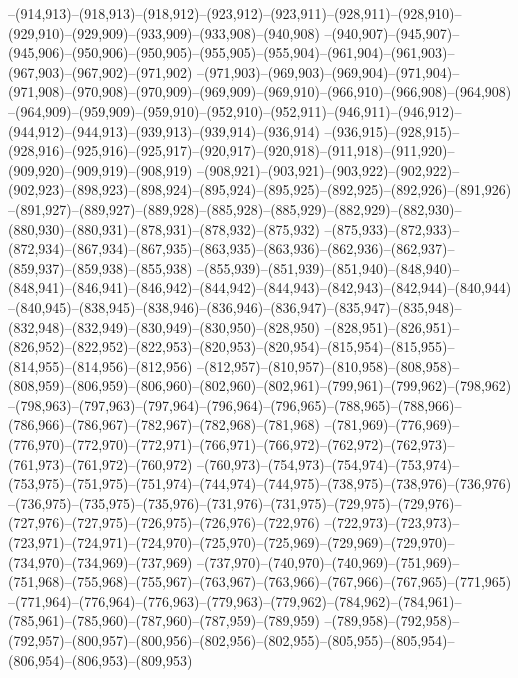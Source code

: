 --(914,913)--(918,913)--(918,912)--(923,912)--(923,911)--(928,911)--(928,910)--(929,910)--(929,909)--(933,909)--(933,908)--(940,908)
--(940,907)--(945,907)--(945,906)--(950,906)--(950,905)--(955,905)--(955,904)--(961,904)--(961,903)--(967,903)--(967,902)--(971,902)
--(971,903)--(969,903)--(969,904)--(971,904)--(971,908)--(970,908)--(970,909)--(969,909)--(969,910)--(966,910)--(966,908)--(964,908)
--(964,909)--(959,909)--(959,910)--(952,910)--(952,911)--(946,911)--(946,912)--(944,912)--(944,913)--(939,913)--(939,914)--(936,914)
--(936,915)--(928,915)--(928,916)--(925,916)--(925,917)--(920,917)--(920,918)--(911,918)--(911,920)--(909,920)--(909,919)--(908,919)
--(908,921)--(903,921)--(903,922)--(902,922)--(902,923)--(898,923)--(898,924)--(895,924)--(895,925)--(892,925)--(892,926)--(891,926)
--(891,927)--(889,927)--(889,928)--(885,928)--(885,929)--(882,929)--(882,930)--(880,930)--(880,931)--(878,931)--(878,932)--(875,932)
--(875,933)--(872,933)--(872,934)--(867,934)--(867,935)--(863,935)--(863,936)--(862,936)--(862,937)--(859,937)--(859,938)--(855,938)
--(855,939)--(851,939)--(851,940)--(848,940)--(848,941)--(846,941)--(846,942)--(844,942)--(844,943)--(842,943)--(842,944)--(840,944)
--(840,945)--(838,945)--(838,946)--(836,946)--(836,947)--(835,947)--(835,948)--(832,948)--(832,949)--(830,949)--(830,950)--(828,950)
--(828,951)--(826,951)--(826,952)--(822,952)--(822,953)--(820,953)--(820,954)--(815,954)--(815,955)--(814,955)--(814,956)--(812,956)
--(812,957)--(810,957)--(810,958)--(808,958)--(808,959)--(806,959)--(806,960)--(802,960)--(802,961)--(799,961)--(799,962)--(798,962)
--(798,963)--(797,963)--(797,964)--(796,964)--(796,965)--(788,965)--(788,966)--(786,966)--(786,967)--(782,967)--(782,968)--(781,968)
--(781,969)--(776,969)--(776,970)--(772,970)--(772,971)--(766,971)--(766,972)--(762,972)--(762,973)--(761,973)--(761,972)--(760,972)
--(760,973)--(754,973)--(754,974)--(753,974)--(753,975)--(751,975)--(751,974)--(744,974)--(744,975)--(738,975)--(738,976)--(736,976)
--(736,975)--(735,975)--(735,976)--(731,976)--(731,975)--(729,975)--(729,976)--(727,976)--(727,975)--(726,975)--(726,976)--(722,976)
--(722,973)--(723,973)--(723,971)--(724,971)--(724,970)--(725,970)--(725,969)--(729,969)--(729,970)--(734,970)--(734,969)--(737,969)
--(737,970)--(740,970)--(740,969)--(751,969)--(751,968)--(755,968)--(755,967)--(763,967)--(763,966)--(767,966)--(767,965)--(771,965)
--(771,964)--(776,964)--(776,963)--(779,963)--(779,962)--(784,962)--(784,961)--(785,961)--(785,960)--(787,960)--(787,959)--(789,959)
--(789,958)--(792,958)--(792,957)--(800,957)--(800,956)--(802,956)--(802,955)--(805,955)--(805,954)--(806,954)--(806,953)--(809,953)
